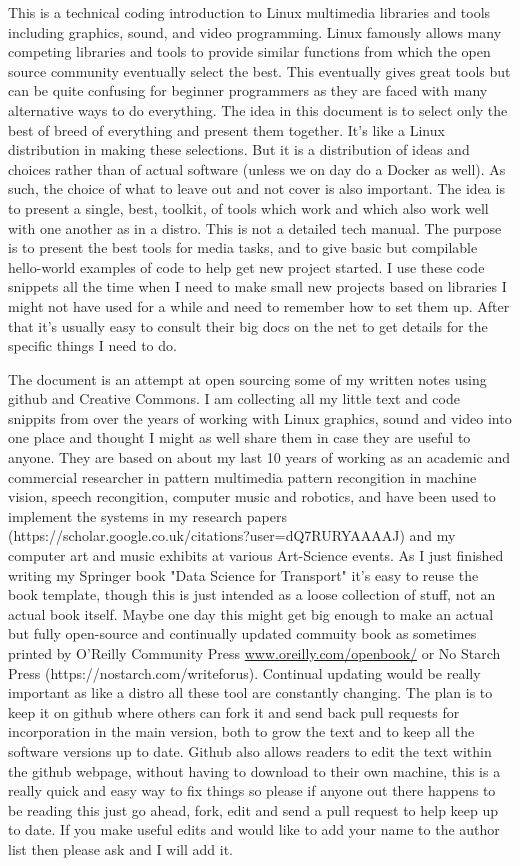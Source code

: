 \documentclass[oneside,english]{scrbook}
\begin{document}
This is a technical coding introduction to Linux multimedia libraries and tools including graphics, sound, and video programming.   Linux famously allows many competing libraries and tools to provide similar functions from which the open source community eventually select the best.  This eventually gives great tools but can be quite confusing for beginner programmers as they are faced with many alternative ways to do everything.  The idea in this document is to select only the best of breed of everything and present them together. It's like a Linux distribution in making these selections. But it is a distribution of ideas and choices rather than of actual software (unless we on day do a Docker as well).   As such, the choice of what to leave out and not cover is also important. The idea is to present a single, best, toolkit, of tools which work and which also work well with one another as in a distro.   This is not a detailed tech manual. The purpose is to present the best tools for media tasks, and to give basic but compilable hello-world examples of code to help get new project started. I use these code snippets all the time when I need to make small new projects based on libraries I might not have used for a while and need to remember how to set them up.  After that it's usually easy to consult their big docs on the net to get details for the specific things I need to do.

The document is an attempt at open sourcing some of my written notes using github and Creative Commons. I am collecting all my little text and code snippits from over the years of working with Linux graphics, sound and video into one place and thought I might as well share them in case they are useful to anyone. They are based on about my last 10 years of working as an academic and commercial researcher in pattern multimedia pattern recongition in machine vision, speech recongition, computer music and robotics, and have been used to implement the systems in my research papers (https://scholar.google.co.uk/citations?user=dQ7RURYAAAAJ) and my computer art and music exhibits at various Art-Science events. As I just finished writing my Springer book "Data Science for Transport" it's easy to reuse the book template, though this is just intended as a loose collection of stuff, not an actual book itself.    Maybe one day this might get big enough to make an actual but fully open-source and continually updated commuity book as sometimes printed by O'Reilly Community Press \url{www.oreilly.com/openbook/} or No Starch Press (https://nostarch.com/writeforus).  Continual updating would be really important as like a distro all these tool are constantly changing.    The plan is to keep it on github where others can fork it and send back pull requests for incorporation in the main version, both to grow the text and to keep all the software versions up to date. Github also allows readers to edit the text within the github webpage, without having to download to their own machine, this is a really quick and easy way to fix things so please if anyone out there happens to be reading this just go ahead, fork, edit and send a pull request to help keep up to date. If you make useful edits and would like to add your name to the author list then please ask and I will add it.
\end{document}
